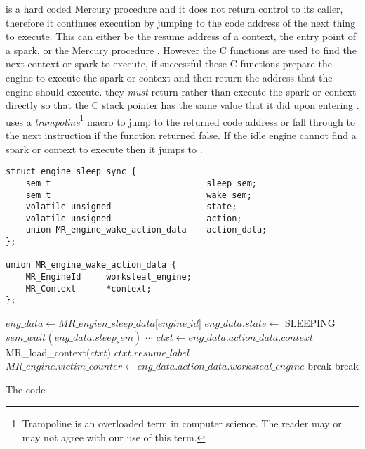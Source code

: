\idle is a hard coded Mercury procedure and it does not return control to
its caller,
therefore it continues execution by jumping to the code address of the next
thing to execute.
This can either be the resume address of a context,
the entry point of a spark,
or the Mercury procedure \sleep.
However
the C functions are used to find the next context or spark to execute,
if successful these C functions prepare the engine to execute the spark or
context and then return the address that the engine should execute.
they \emph{must} return rather than execute the spark or context directly so
that the C stack pointer has the same value that it did upon entering \idle.
\idle uses a \emph{trampoline}\footnote{
    Trampoline is an overloaded term in computer science.
    The reader may or may not agree with our use of this term.
    }
macro to jump to the returned code
address or fall through to the next instruction if the function returned
false.
If the idle engine cannot find a spark or context to execute then it jumps
to \sleep.

\begin{algorithm}
\begin{minipage}{\textwidth}
\begin{verbatim}
struct engine_sleep_sync {
    sem_t                               sleep_sem;
    sem_t                               wake_sem;
    volatile unsigned                   state;
    volatile unsigned                   action;
    union MR_engine_wake_action_data    action_data;
};

union MR_engine_wake_action_data {      
    MR_EngineId     worksteal_engine;
    MR_Context      *context;
};
\end{verbatim}

\begin{algorithmic}
        \Loop
            \State $eng\_data \gets MR\_engien\_sleep\_data$[$engine\_id$]
            \State $eng\_data.state \gets$ SLEEPING
            \State $sem\_wait(eng\_data.sleep_sem)$
                \State $\cdots$
              \EndCase
                \State $ctxt \gets eng\_data.action\_data.context$
                \State MR\_load\_context($ctxt$)
                \Goto $ctxt.resume\_label$
              \EndCase
                \State $MR\_engine.victim\_counter \gets
                    eng\_data.action\_data.worksteal\_engine$ 
                \State {}
                \State {}
                \State break
              \EndCase
                \State {}
                \State {}
                \State break
              \EndCase
            \EndSwitch
        \EndLoop
    \EndProcedure
\end{algorithmic}

\end{minipage}
\caption{The \sleep code}
\end{algorithm}

